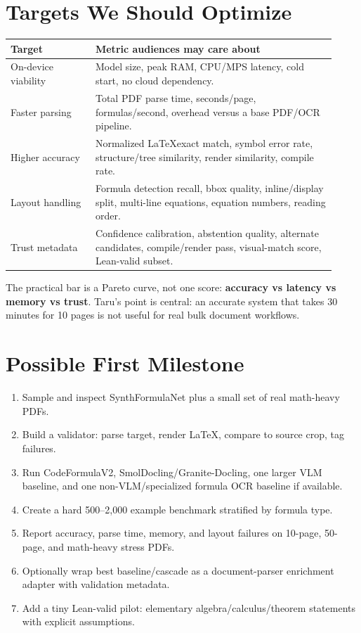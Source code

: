 \documentclass[10pt]{article}
\begin{document}
\section{Targets We Should Optimize}

\begin{tabular}{p{0.24\linewidth}p{0.68\linewidth}}
\toprule
\textbf{Target} & \textbf{Metric audiences may care about} \\
\midrule
On-device viability & Model size, peak RAM, CPU/MPS latency, cold start, no cloud dependency. \\
Faster parsing & Total PDF parse time, seconds/page, formulas/second, overhead versus a base PDF/OCR pipeline. \\
Higher accuracy & Normalized \LaTeX exact match, symbol error rate, structure/tree similarity, render similarity, compile rate. \\
Layout handling & Formula detection recall, bbox quality, inline/display split, multi-line equations, equation numbers, reading order. \\
Trust metadata & Confidence calibration, abstention quality, alternate candidates, compile/render pass, visual-match score, Lean-valid subset. \\
\bottomrule
\end{tabular}

The practical bar is a Pareto curve, not one score: \textbf{accuracy vs latency vs memory vs trust}. Taru's point is central: an accurate system that takes 30 minutes for 10 pages is not useful for real bulk document workflows.

\section{Possible First Milestone}

\begin{enumerate}
\item Sample and inspect SynthFormulaNet plus a small set of real math-heavy PDFs.
\item Build a validator: parse target, render \LaTeX, compare to source crop, tag failures.
\item Run CodeFormulaV2, SmolDocling/Granite-Docling, one larger VLM baseline, and one non-VLM/specialized formula OCR baseline if available.
\item Create a hard 500--2,000 example benchmark stratified by formula type.
\item Report accuracy, parse time, memory, and layout failures on 10-page, 50-page, and math-heavy stress PDFs.
\item Optionally wrap best baseline/cascade as a document-parser enrichment adapter with validation metadata.
\item Add a tiny Lean-valid pilot: elementary algebra/calculus/theorem statements with explicit assumptions.
\end{enumerate}
\end{document}

